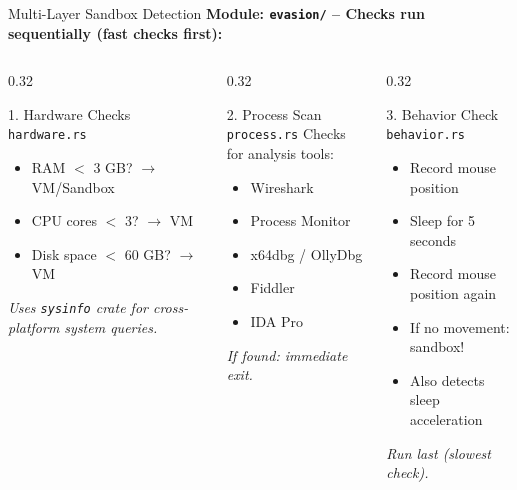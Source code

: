 \documentclass[aspectratio=169]{beamer}
\newcommand{\code}[1]{\texttt{\textcolor{primaryblue}{#1}}}
\begin{document}
\begin{frame}{Multi-Layer Sandbox Detection}
  \textbf{Module: \code{evasion/} -- Checks run sequentially (fast checks first):}

  \vspace{0.5em}
  \begin{columns}[T]
    \begin{column}{0.32\textwidth}
      \begin{block}{1. Hardware Checks \\ \footnotesize\code{hardware.rs}}
        \footnotesize
        \begin{itemize}
          \item RAM $<$ 3 GB? $\rightarrow$ VM/Sandbox
          \item CPU cores $<$ 3? $\rightarrow$ VM
          \item Disk space $<$ 60 GB? $\rightarrow$ VM
        \end{itemize}
        \vspace{0.3em}
        \textit{Uses \code{sysinfo} crate for cross-platform system queries.}
      \end{block}
    \end{column}
    \begin{column}{0.32\textwidth}
      \begin{block}{2. Process Scan \\ \footnotesize\code{process.rs}}
        \footnotesize
        Checks for analysis tools:
        \begin{itemize}
          \item Wireshark
          \item Process Monitor
          \item x64dbg / OllyDbg
          \item Fiddler
          \item IDA Pro
        \end{itemize}
        \textit{If found: immediate exit.}
      \end{block}
    \end{column}
    \begin{column}{0.32\textwidth}
      \begin{block}{3. Behavior Check \\ \footnotesize\code{behavior.rs}}
        \footnotesize
        \begin{itemize}
          \item Record mouse position
          \item Sleep for 5 seconds
          \item Record mouse position again
          \item If no movement: \alert{sandbox!}
          \item Also detects sleep acceleration
        \end{itemize}
        \textit{Run last (slowest check).}
      \end{block}
    \end{column}
  \end{columns}


\end{frame}
\end{document}

